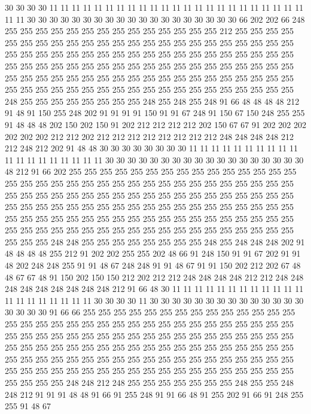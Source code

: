 30 30 30 30 11 11 11 11 11 11 11 11 11 11 11 11 11 11 11 11
11 11 11 11 11 11 11 11 11 30 30 30 30 30 30 30 30 30 30 30
30 30 30 30 30 30 30 30 66 202 202 66 248 255 255 255 255 255 255 255
255 255 255 255 255 255 255 212 255 255 255 255 255 255 255 255 255 255 255 255
255 255 255 255 255 255 255 255 255 255 255 255 255 255 255 255 255 255 255 255
255 255 255 255 255 255 255 255 255 255 255 255 255 255 255 255 255 255 255 255
255 255 255 255 255 255 255 255 255 255 255 255 255 255 255 255 255 255 255 255
255 255 255 255 255 255 255 255 255 255 255 255 255 255 255 255 255 255 255 255
255 255 255 255 255 255 255 248 255 255 255 255 255 255 255 255 248 255 248 255
248 91 66 48 48 48 48 212 91 48 91 150 255 248 202 91 91 91 91 150
91 91 67 248 91 150 67 150 248 255 255 91 48 48 48 202 150 202 150 91
202 212 212 212 212 202 150 67 67 91 202 202 202 202 202 202 212 212 202 212
212 212 212 212 212 212 212 248 248 248 248 212 212 248 212 202 91 48 48 30
30 30 30 30 30 30 30 11 11 11 11 11 11 11 11 11 11 11 11 11
11 11 11 11 11 11 30 30 30 30 30 30 30 30 30 30 30 30 30 30
30 30 30 30 48 212 91 66 202 255 255 255 255 255 255 255 255 255 255 255
255 255 255 255 255 255 255 255 255 255 255 255 255 255 255 255 255 255 255 255
255 255 255 255 255 255 255 255 255 255 255 255 255 255 255 255 255 255 255 255
255 255 255 255 255 255 255 255 255 255 255 255 255 255 255 255 255 255 255 255
255 255 255 255 255 255 255 255 255 255 255 255 255 255 255 255 255 255 255 255
255 255 255 255 255 255 255 255 255 255 255 255 255 255 255 255 255 255 255 255
255 255 248 248 255 255 255 255 255 255 255 255 248 255 248 248 248 202 91 48
48 48 48 255 212 91 202 202 255 255 202 48 66 91 248 150 91 91 67 202
91 91 48 202 248 248 255 91 91 48 67 248 248 91 91 48 67 91 91 150
202 212 202 67 48 48 67 67 48 91 150 202 150 150 212 202 212 212 248 248
248 248 212 212 248 248 248 248 248 248 248 248 248 212 91 66 48 30 11 11
11 11 11 11 11 11 11 11 11 11 11 11 11 11 11 11 11 11 30 30
30 30 11 30 30 30 30 30 30 30 30 30 30 30 30 30 30 30 30 30
30 91 66 66 255 255 255 255 255 255 255 255 255 255 255 255 255 255 255 255
255 255 255 255 255 255 255 255 255 255 255 255 255 255 255 255 255 255 255 255
255 255 255 255 255 255 255 255 255 255 255 255 255 255 255 255 255 255 255 255
255 255 255 255 255 255 255 255 255 255 255 255 255 255 255 255 255 255 255 255
255 255 255 255 255 255 255 255 255 255 255 255 255 255 255 255 255 255 255 255
255 255 255 255 255 255 255 255 255 255 255 255 255 255 255 255 255 248 248 212
248 255 255 255 255 255 255 255 248 255 255 248 248 212 91 91 91 48 48 91
66 91 255 248 91 91 66 48 91 255 202 91 66 91 248 255 255 91 48 67
